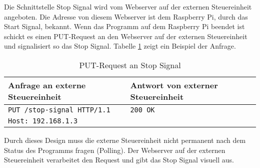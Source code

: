 Die Schnittstelle Stop Signal wird vom Webserver auf der externen Steuereinheit angeboten. Die Adresse von diesem Webserver ist dem Raspberry Pi, durch das Start Signal, bekannt. Wenn das Programm auf dem Raspberry Pi beendet ist schickt es einen PUT-Request an den Webserver auf der externen Steuereinheit und signalisiert so das Stop Signal. Tabelle \ref{tab:put-stop-signal} zeigt ein Beispiel der Anfrage.

\begin{table}[h!]
	\centering
	\begin{tabular}{|l|l|}
		\hline Anfrage an externe Steuereinheit	 & Antwort von externer Steuereinheit \\ 
		\hline \verb|PUT /stop-signal HTTP/1.1|  & \verb|200 OK| 					  \\
			   \verb|Host: 192.168.1.3| 		 & 							          \\
		\hline 
	\end{tabular} 
	\caption{PUT-Request an Stop Signal}
	\label{tab:put-stop-signal}
\end{table}

Durch dieses Design muss die externe Steuereinheit nicht permanent nach dem Status des Programms fragen (Polling). Der Webserver auf der externen Steuereinheit verarbeitet den Request und gibt das Stop Signal visuell aus.